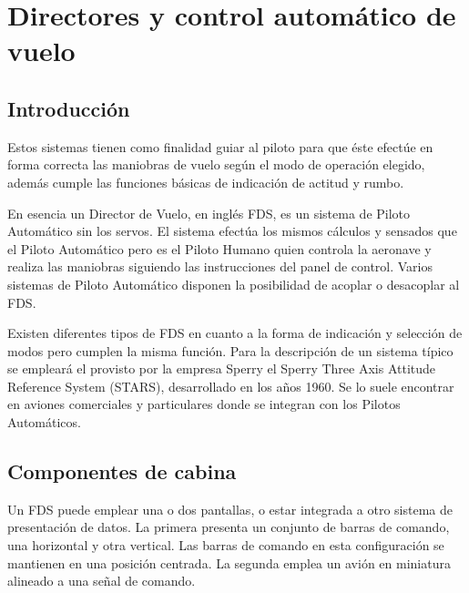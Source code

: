 

\chapter{Directores y control autom\'atico de vuelo}
\label{chap:U07.director.vuelo}

\section{Introducci\'on}
\label{sec:07.00.introduccion}

Estos sistemas tienen como finalidad guiar al piloto para que \'este efect\'ue en forma correcta las maniobras de vuelo seg\'un el modo de operaci\'on elegido, adem\'as cumple las funciones b\'asicas de indicaci\'on de actitud y rumbo.

En esencia un Director de Vuelo, en ingl\'es \ac{FDS}, es un sistema de Piloto Autom\'atico sin los servos. El sistema efect\'ua los mismos c\'alculos y sensados que el Piloto Autom\'atico pero es el Piloto Humano quien controla la aeronave y realiza las maniobras siguiendo las instrucciones del panel de control. Varios sistemas de Piloto Autom\'atico disponen la posibilidad de acoplar o desacoplar al \ac{FDS}.

Existen diferentes tipos de \ac{FDS} en cuanto a la forma de 
indicaci\'on y selecci\'on de modos pero cumplen la misma funci\'on. Para la descripci\'on de un sistema t\'ipico se emplear\'a el provisto por la empresa Sperry el Sperry Three Axis Attitude Reference System (STARS), desarrollado en los a\~nos 1960. Se lo suele encontrar en aviones comerciales y particulares donde se integran con los Pilotos Autom\'aticos.


\section{Componentes de cabina}
\label{sec:componentes.cabina}

Un \ac{FDS} puede emplear una o dos pantallas, o estar integrada a otro sistema de presentaci\'on de datos. 
La primera presenta un conjunto de barras de comando, una horizontal y otra vertical. Las barras de comando en esta configuración se mantienen en una posición centrada. 
La segunda emplea un avión en miniatura alineado a una señal de comando.

